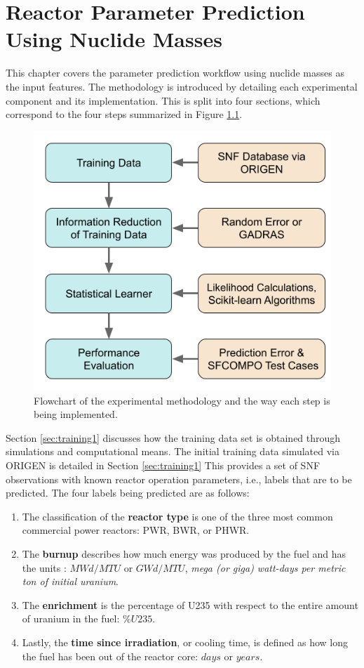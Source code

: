 
\glsresetall

\chapter{Reactor Parameter Prediction Using Nuclide Masses}
\label{ch:exp1}

This chapter covers the parameter prediction workflow using nuclide masses as
the input features. The methodology is introduced by detailing each
experimental component and its implementation. This is split into four
sections, which correspond to the four steps summarized in Figure
\ref{fig:method}.

\begin{figure}[!ht]
  \centering
  \includegraphics[width=0.7\linewidth]{./chapters/exp1/methodology.png}
  \caption{Flowchart of the experimental methodology and the way each step is being implemented.}
  \label{fig:method}
\end{figure}

Section \ref{sec:training1} discusses how the training data set is obtained
through simulations and computational means. The initial training data
simulated via \gls{ORIGEN} is detailed in Section \ref{sec:training1} This
provides a set of \gls{SNF} observations with known reactor operation
parameters, i.e., labels that are to be predicted. The four labels being
predicted are as follows:
\begin{enumerate}
  \item The classification of the \textbf{reactor type} is one of the three
        most common commercial power reactors: \gls{PWR}, \gls{BWR}, or 
        \gls{PHWR}.
  \item The \textbf{burnup} describes how much energy was produced by the fuel
        and has the units : $MWd/MTU$ or $GWd/MTU$, \textit{mega (or giga) 
        watt-days per metric ton of initial uranium}.
  \item The \textbf{enrichment} is the percentage of \gls{U235} with respect to
        the entire amount of uranium in the fuel: $\%U235$. 
  \item Lastly, the \textbf{time since irradiation}, or cooling time, is
        defined as how long the fuel has been out of the reactor core: $days$ 
        or $years$.
\end{enumerate}

